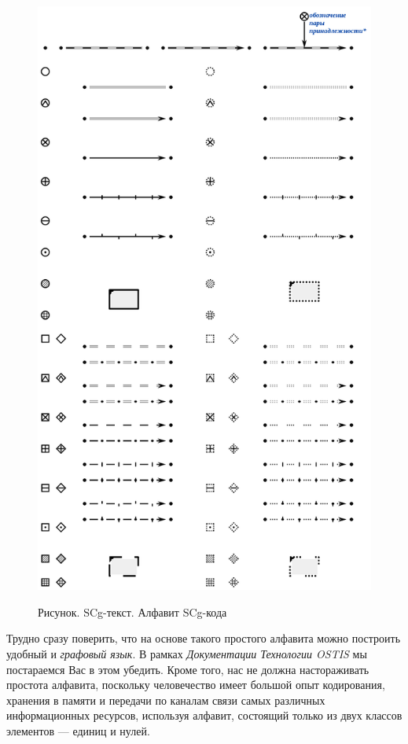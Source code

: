 \begin{figure}[H]
	\centering
	\caption{Рисунок. SCg-текст. Алфавит SCg-кода\scnsupergroupsign}
	\includegraphics[scale=0.7]{images/intro/scg/SCg-full.png}
	\label{fig:scg_full}
\end{figure}

\bigskip
Трудно сразу поверить, что на основе такого простого алфавита можно построить удобный и  \textit{графовый язык}. В рамках \textit{Документации Технологии OSTIS} мы постараемся Вас в этом убедить. Кроме того, нас не должна настораживать простота алфавита, поскольку человечество имеет большой опыт кодирования, хранения в памяти и передачи по каналам связи самых различных информационных ресурсов, используя алфавит, состоящий только из двух классов элементов --- единиц и нулей. 

